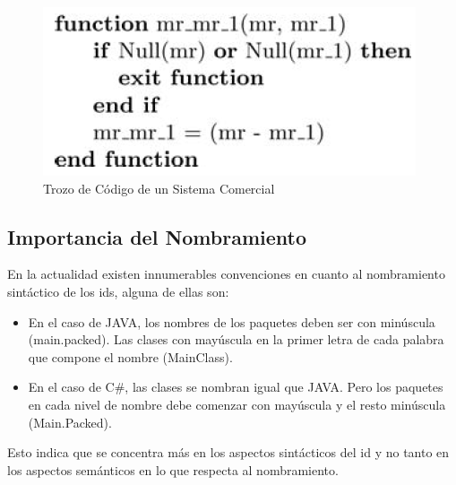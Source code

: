 \documentclass[a4paper,12pt]{report}
\begin{document}


\begin{figure}[t] %
\centering
\includegraphics[scale= 0.70]{./idd_1.png}
\caption{Trozo de Código de un Sistema Comercial}
\label{captura2}
\end{figure} 

\subsection{Importancia del Nombramiento}
En la actualidad existen innumerables convenciones en cuanto al nombramiento sintáctico de los ids, alguna de ellas son:

\begin{itemize}
\itemsep0em%
\item En el caso de JAVA, los nombres de los paquetes deben ser con minúscula (main.packed). Las clases con mayúscula en la primer letra de cada palabra que compone el nombre (MainClass).

\item En el caso de C\#, las clases se nombran igual que JAVA. Pero los paquetes en cada nivel de nombre debe comenzar con mayúscula y el resto minúscula (Main.Packed).
\end{itemize}

Esto indica que se concentra más en los aspectos sintácticos del id y no tanto en los aspectos semánticos en lo que respecta al nombramiento. 

\end{document}
